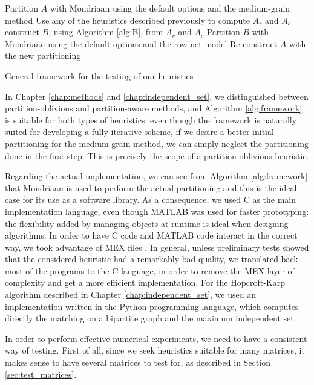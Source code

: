 \begin{algorithm}[h]
	\begin{algorithmic}
		\State Partition $A$ with Mondriaan using the default options and the medium-grain method
		\State Use any of the heuristics described previously to compute $A_r$ and $A_c$
		\State construct $B$, using Algorithm \ref{alg:B}, from $A_r$ and $A_c$
		\State Partition $B$ with Mondriaan using the default options and the row-net model
		\State Re-construct $A$ with the new partitioning
		\EndFor
	\end{algorithmic}
	\caption{General framework for the testing of our heuristics} \label{alg:framework}
\end{algorithm}

In Chapter \ref{chap:methods} and \ref{chap:independent_set}, we distinguished between partition-oblivious and partition-aware methods, and Algorithm \ref{alg:framework} is suitable for both types of heuristics: even though the framework is naturally suited for developing a fully iterative scheme, if we desire a better initial partitioning for the medium-grain method, we can simply neglect the partitioning done in the first step. This is precisely the scope of a partition-oblivious heuristic.

Regarding the actual implementation, we can see from Algorithm \ref{alg:framework} that Mondriaan is used to perform the actual partitioning and this is the ideal case for its use as a software library. As a consequence, we used C as the main implementation language, even though MATLAB was used for faster prototyping: the flexibility added by managing objects at runtime  is ideal when designing algorithms. In order to have C code and MATLAB code interact in the correct way, we took advantage of MEX files \cite{mex}. In general, unless preliminary tests showed that the considered heuristic had a remarkably bad quality, we translated back most of the programs to the C language, in order to remove the MEX layer of complexity and get a more efficient implementation. For the Hopcroft-Karp algorithm described in Chapter \ref{chap:independent_set}, we used an implementation \cite{hkarp_impl} written in the Python programming language, which computes directly the matching on a bipartite graph and the maximum independent set. 

In order to perform effective numerical experiments, we need to have a consistent way of testing. First of all, since we seek heuristics suitable for many matrices, it makes sense to have several matrices to test for, as described in Section \ref{sec:test_matrices}. 

